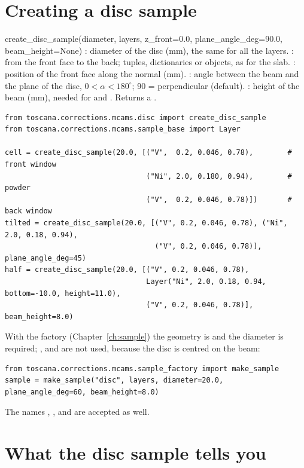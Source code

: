 \section{Creating a disc sample}

\begin{fnbox}{create\_disc\_sample(diameter, layers, z\_front=0.0, plane\_angle\_deg=90.0, beam\_height=None)}
: diameter of the disc (mm), the same for all the layers.
: from the front face to the back; tuples, dictionaries or  objects, as for the slab.
: position of the front face along the normal (mm).
: angle between the beam and the plane of the disc, $0<\alpha<180^\circ$; 90 = perpendicular (default).
: height of the beam (mm), needed for  and .
Returns a .
\end{fnbox}

\begin{lstlisting}
from toscana.corrections.mcams.disc import create_disc_sample
from toscana.corrections.mcams.sample_base import Layer

cell = create_disc_sample(20.0, [("V",  0.2, 0.046, 0.78),        # front window
                                 ("Ni", 2.0, 0.180, 0.94),        # powder
                                 ("V",  0.2, 0.046, 0.78)])       # back window
tilted = create_disc_sample(20.0, [("V", 0.2, 0.046, 0.78), ("Ni", 2.0, 0.18, 0.94),
                                   ("V", 0.2, 0.046, 0.78)], plane_angle_deg=45)
half = create_disc_sample(20.0, [("V", 0.2, 0.046, 0.78),
                                 Layer("Ni", 2.0, 0.18, 0.94, bottom=-10.0, height=11.0),
                                 ("V", 0.2, 0.046, 0.78)], beam_height=8.0)
\end{lstlisting}
With the factory (Chapter~\ref{ch:sample}) the geometry is  and the diameter is required; ,
 and  are not used, because the disc is centred on the beam:
\begin{lstlisting}
from toscana.corrections.mcams.sample_factory import make_sample
sample = make_sample("disc", layers, diameter=20.0, plane_angle_deg=60, beam_height=8.0)
\end{lstlisting}
The names , ,  and  are accepted as well.

\section{What the disc sample tells you}

